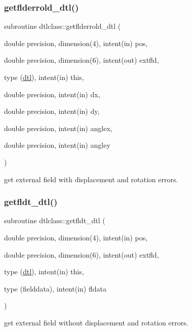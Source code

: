 \subsubsection{\texorpdfstring{getflderrold\_dtl()}{getflderrold\_dtl()}}
{\footnotesize\ttfamily subroutine dtlclass\+::getflderrold\+\_\+dtl (\begin{DoxyParamCaption}\item[{double precision, dimension(4), intent(in)}]{pos,  }\item[{double precision, dimension(6), intent(out)}]{extfld,  }\item[{type (\mbox{\hyperlink{namespacedtlclass_structdtlclass_1_1dtl}{dtl}}), intent(in)}]{this,  }\item[{double precision, intent(in)}]{dx,  }\item[{double precision, intent(in)}]{dy,  }\item[{double precision, intent(in)}]{anglex,  }\item[{double precision, intent(in)}]{angley }\end{DoxyParamCaption})}



get external field with displacement and rotation errors. 

\mbox{\label{namespacedtlclass_aef6d69ea2a551751181175c270a8b745}} 
\subsubsection{\texorpdfstring{getfldt\_dtl()}{getfldt\_dtl()}}
{\footnotesize\ttfamily subroutine dtlclass\+::getfldt\+\_\+dtl (\begin{DoxyParamCaption}\item[{double precision, dimension(4), intent(in)}]{pos,  }\item[{double precision, dimension(6), intent(out)}]{extfld,  }\item[{type (\mbox{\hyperlink{namespacedtlclass_structdtlclass_1_1dtl}{dtl}}), intent(in)}]{this,  }\item[{type (fielddata), intent(in)}]{fldata }\end{DoxyParamCaption})}



get external field without displacement and rotation errors. 

